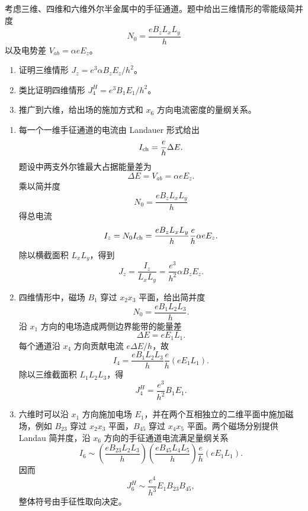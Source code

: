 \begin{question}[外尔半金属中的反常电流]
考虑三维、四维和六维外尔半金属中的手征通道。题中给出三维情形的零能级简并度
\[
  N_0=\frac{eB_zL_xL_y}{h}
\]
以及电势差 $V_{ab}=\alpha eE_z$。
\begin{enumerate}
  \item 证明三维情形 $J_z=e^3\alpha B_zE_z/h^2$。
  \item 类比证明四维情形 $J_4^H=e^3B_1E_1/h^2$。
  \item 推广到六维，给出场的施加方式和 $x_6$ 方向电流密度的量纲关系。
\end{enumerate}
\begin{solution}
\begin{enumerate}
  \item 每一个一维手征通道的电流由 Landauer 形式给出
  \[
    I_{\rm ch}=\frac{e}{h}\Delta E .
  \]
  题设中两支外尔锥最大占据能量差为
  \[
    \Delta E=V_{ab}=\alpha eE_z .
  \]
  乘以简并度
  \[
    N_0=\frac{eB_zL_xL_y}{h}
  \]
  得总电流
  \[
    I_z=N_0I_{\rm ch}
    =\frac{eB_zL_xL_y}{h}\frac{e}{h}\alpha eE_z .
  \]
  除以横截面积 $L_xL_y$，得到
  \[
    \boxed{J_z=\frac{I_z}{L_xL_y}=\frac{e^3}{h^2}\alpha B_zE_z} .
  \]

  \item 四维情形中，磁场 $B_1$ 穿过 $x_2x_3$ 平面，给出简并度
  \[
    N_0=\frac{eB_1L_2L_3}{h} .
  \]
  沿 $x_1$ 方向的电场造成两侧边界能带的能量差
  \[
    \Delta E=eE_1L_1 .
  \]
  每个通道沿 $x_4$ 方向贡献电流 $e\Delta E/h$，故
  \[
    I_4=\frac{eB_1L_2L_3}{h}\frac{e}{h}(eE_1L_1) .
  \]
  除以三维截面积 $L_1L_2L_3$，得
  \[
    \boxed{J_4^H=\frac{e^3}{h^2}B_1E_1} .
  \]

  \item 六维时可以沿 $x_1$ 方向施加电场 $E_1$，并在两个互相独立的二维平面中施加磁场，例如 $B_{23}$ 穿过 $x_2x_3$ 平面，$B_{45}$ 穿过 $x_4x_5$ 平面。两个磁场分别提供 Landau 简并度，沿 $x_6$ 方向的手征通道电流满足量纲关系
  \[
    I_6\sim
    \left(\frac{eB_{23}L_2L_3}{h}\right)
    \left(\frac{eB_{45}L_4L_5}{h}\right)
    \frac{e}{h}(eE_1L_1) .
  \]
  因而
  \[
    \boxed{J_6^H\sim\frac{e^4}{h^3}E_1B_{23}B_{45}} ,
  \]
  整体符号由手征性取向决定。
\end{enumerate}
\end{solution}
\end{question}
